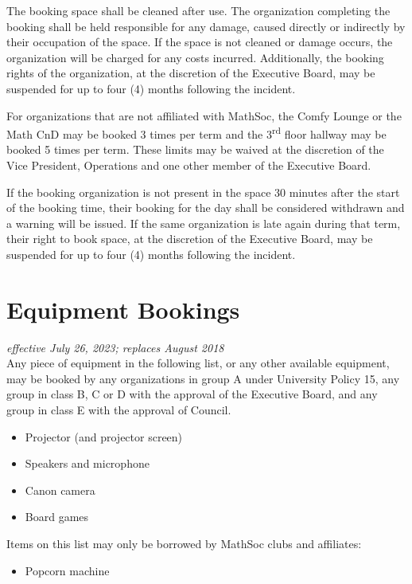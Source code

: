 The booking space shall be cleaned after use. The organization completing the
booking shall be held responsible for any damage, caused directly or indirectly
by their occupation of the space. If the space is not cleaned or damage occurs,
the organization will be charged for any costs incurred. Additionally, the
booking rights of the organization, at the discretion of the Executive Board,
may be suspended for up to four (4) months following the incident.

For organizations that are not affiliated with MathSoc, the Comfy Lounge or the
Math CnD may be booked 3 times per term and the 3\textsuperscript{rd} floor
hallway may be booked 5 times per term. These limits may be waived at the
discretion of the Vice President, Operations and one other member of the
Executive Board.

If the booking organization is not present in the space 30 minutes after the
start of the booking time, their booking for the day shall be considered
withdrawn and a warning will be issued. If the same organization is late again
during that term, their right to book space, at the discretion of the Executive
Board, may be suspended for up to four (4) months following the incident.

\section{Equipment Bookings}
\emph{effective July 26, 2023; replaces August 2018}\\

Any piece of equipment in the following list, or any other available equipment,
may be booked by any organizations in group A under University Policy 15, any
group in class B, C or D with the approval of the Executive Board, and any
group in class E with the approval of Council.

\begin{itemize}
  \item Projector (and projector screen)
  \item Speakers and microphone
  \item Canon camera
  \item Board games
\end{itemize}

Items on this list may only be borrowed by MathSoc clubs and affiliates:

\begin{itemize}
  \item Popcorn machine
\end{itemize}

